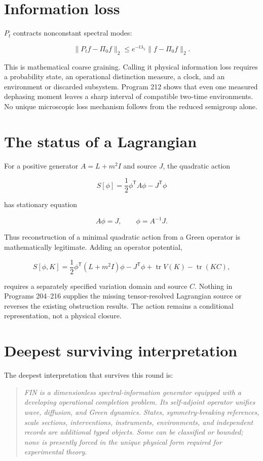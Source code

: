 \documentclass[11pt,a4paper,openany]{report}
\begin{document}
\section{Information loss}

\(P_t\) contracts nonconstant spectral modes:

\[
\|P_tf-\Pi_0f\|_2
\le
e^{-t\lambda_1}\|f-\Pi_0f\|_2.
\]

This is mathematical coarse graining. Calling it physical information loss requires a probability state, an operational distinction measure, a clock, and an environment or discarded subsystem. Program 212 shows that even one measured dephasing moment leaves a sharp interval of compatible two-time environments. No unique microscopic loss mechanism follows from the reduced semigroup alone.

\section{The status of a Lagrangian}

For a positive generator \(A=L+m^2I\) and source \(J\), the quadratic action

\[
S[\phi]
=
\frac12\phi^\mathsf TA\phi-J^\mathsf T\phi
\]

has stationary equation

\[
A\phi=J,
\qquad
\phi=A^{-1}J.
\]

Thus reconstruction of a minimal quadratic action from a Green operator is mathematically legitimate. Adding an operator potential,

\[
S[\phi,K]
=
\frac12\phi^\mathsf T(L+m^2I)\phi-J^\mathsf T\phi
+
\operatorname{tr}V(K)-\operatorname{tr}(KC),
\]

requires a separately specified variation domain and source \(C\). Nothing in Programs 204--216 supplies the missing tensor-resolved Lagrangian source or reverses the existing obstruction results. The action remains a conditional representation, not a physical closure.

\section{Deepest surviving interpretation}

The deepest interpretation that survives this round is:

\begin{quote}\itshape
FIN is a dimensionless spectral-information generator equipped with a developing operational completion problem. Its self-adjoint operator unifies wave, diffusion, and Green dynamics. States, symmetry-breaking references, scale sections, interventions, instruments, environments, and independent records are additional typed objects. Some can be classified or bounded; none is presently forced in the unique physical form required for experimental theory.

\end{quote}
\end{document}
